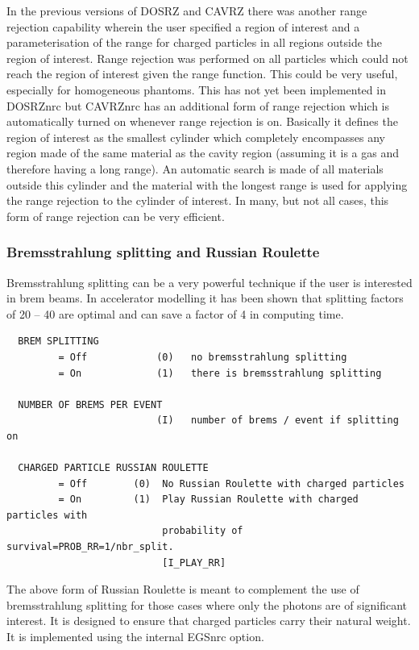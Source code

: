 \documentclass[12pt,twoside]{article}  %
\begin{document}
In the previous versions of DOSRZ and CAVRZ there was another range
rejection capability wherein the user specified a region of interest and a
parameterisation of the range for charged particles in all regions outside
the region of interest. Range rejection was performed on all particles
which could not reach the region of interest given the range function. This
could be very useful, especially for homogeneous phantoms.  This has not
yet been implemented in DOSRZnrc but CAVRZnrc has an additional form of
range rejection which is automatically turned on whenever range rejection
is on.  Basically it defines the region of interest as the smallest
cylinder which completely encompasses any region made of the same material
as the cavity region (assuming it is a gas and therefore having a long
range).  An automatic search is made of all materials outside this cylinder
and the material with the longest range is used for applying the range
rejection to the cylinder of interest.  In many, but not all cases, this
form of range rejection can be very efficient.

\subsubsection[Brem splitting and Russian Roulette]{Bremsstrahlung 
splitting and Russian Roulette}

Bremsstrahlung splitting can be a very powerful technique if the user is
interested in brem beams. In accelerator modelling it has been
shown that splitting factors of 20 -- 40 are optimal\cite{Ro98a} and can
save a factor of 4 in computing time.

\begin{verbatim}
  BREM SPLITTING
         = Off            (0)   no bremsstrahlung splitting
         = On             (1)   there is bremsstrahlung splitting

  NUMBER OF BREMS PER EVENT
                          (I)   number of brems / event if splitting on

  CHARGED PARTICLE RUSSIAN ROULETTE
         = Off        (0)  No Russian Roulette with charged particles
         = On         (1)  Play Russian Roulette with charged particles with
                           probability of survival=PROB_RR=1/nbr_split.
                           [I_PLAY_RR]  
\end{verbatim}
The above form of Russian Roulette is meant to complement the use of
bremsstrahlung splitting for those cases where only the photons are of
significant interest. It is designed to ensure that charged particles carry
their natural weight. It is implemented using the internal EGSnrc option.
\end{document}
